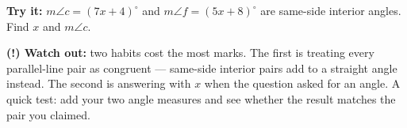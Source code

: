 \documentclass[12pt]{article}
\begin{document}
\begin{tryitbox}
\textbf{Try it:} $m\angle c = (7x + 4)^\circ$ and $m\angle f = (5x + 8)^\circ$
are same-side interior angles. Find $x$ and $m\angle c$.\\[2pt]
\end{tryitbox}

\begin{watchoutbox}
\textbf{(!) Watch out:} two habits cost the most marks. The first is treating
every parallel-line pair as congruent --- same-side interior pairs add to a
straight angle instead. The second is answering with $x$ when the question
asked for an angle. A quick test: add your two angle measures and see whether
the result matches the pair you claimed.
\end{watchoutbox}
\end{document}
